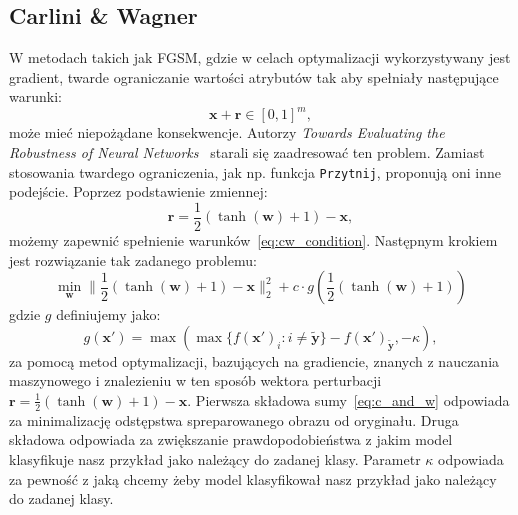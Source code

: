\documentclass[
    left=2.5cm,         %
    right=2.5cm,        %
    top=2.5cm,          %
    bottom=3cm,         %
    bindingoffset=6mm,  %
    nohyphenation=false %
]{eiti/eiti-thesis}
\renewcommand{\vec}[1]{\mathbf{#1}}
\renewcommand{\function}[1]{\texttt{#1}}
\begin{document}
\subsection{Carlini \& Wagner}
W metodach takich jak FGSM, gdzie w celach optymalizacji wykorzystywany jest gradient, twarde ograniczanie wartości atrybutów
tak aby spełniały następujące warunki:
\begin{equation}\label{eq:cw_condition}
    \vec{x}+\vec{r} \in [0,1]^m,
\end{equation}
może mieć niepożądane konsekwencje.
Autorzy \textit{Towards Evaluating the Robustness of Neural Networks}~\cite{DBLP:journals/corr/CarliniW16a} starali się zaadresować ten problem.
Zamiast stosowania twardego ograniczenia, jak np. funkcja \function{Przytnij}, proponują oni inne podejście.
Poprzez podstawienie zmiennej:
\begin{equation}
    \vec{r} = \frac{1}{2}(\tanh(\vec{w})+1) - \vec{x},
\end{equation}
możemy zapewnić spełnienie warunków~\eqref{eq:cw_condition}.
Następnym krokiem jest rozwiązanie tak zadanego problemu:
\begin{equation}\label{eq:c_and_w}
\min_{\vec{w}}\| \frac { 1 } { 2 } ( \tanh ( \vec{w} ) + 1 ) - \vec{x} \| _ { 2 } ^ { 2 } + c \cdot g ( \frac { 1 } { 2 } ( \tanh ( \vec{w} ) + 1 ) )
\end{equation}
gdzie $g$ definiujemy jako:
\begin{equation}
    g ( \vec{x'} ) = \max ( \max \{ f ( \vec{x'} ) _ { i } : i \neq \vec{\widetilde{y}} \} - f ( \vec{x'} ) _ { \vec{\widetilde{y}} } , - \kappa),
\end{equation}
za pomocą metod optymalizacji, bazujących na gradiencie, znanych z nauczania maszynowego i znalezieniu w ten sposób wektora
perturbacji $\vec{r} = \frac{1}{2}(\tanh(\vec{w})+1) - \vec{x}$.
Pierwsza składowa sumy~\eqref{eq:c_and_w} odpowiada za minimalizację odstępstwa spreparowanego obrazu
od oryginału. Druga składowa odpowiada za zwiększanie prawdopodobieństwa z jakim model klasyfikuje nasz przykład
jako należący do zadanej klasy. Parametr \(\kappa\) odpowiada za pewność z jaką chcemy żeby model klasyfikował nasz
przykład jako należący do zadanej klasy.


\end{document}
